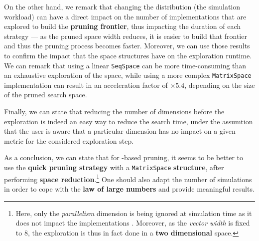 On the other hand, we remark that changing the distribution (\ie the simulation workload) can have a direct impact on the number of implementations that are explored to build the {\bf pruning frontier}, thus impacting the duration of each strategy --- as the pruned space width reduces, it is easier to build that frontier and thus the pruning process becomes faster.
Moreover, we can use those results to confirm the impact that the space structures have on the exploration runtime.
We can remark that using a linear \lstinline{SeqSpace} can be more time-consuming than an exhaustive exploration of the space, while using a more complex \lstinline{MatrixSpace} implementation can result in an acceleration factor of $\times 5.4$, depending on the size of the pruned search space.

Finally, we can state that reducing the number of dimensions before the exploration is indeed an easy way to reduce the search time, under the assumtion that the user is aware that a particular dimension has no impact on a given metric for the considered exploration step.

As a conclusion, we can state that for -based pruning, it seems to be better to use the {\bf quick pruning strategy} with a \lstinline{MatrixSpace} {\bf structure}, after performing {\bf space reduction}.\footnote{Here, only the {\it parallelism} dimension is being ignored at simulation time as it does not impact the implementations . Moreover, as the {\it vector width} is fixed to 8, the exploration is thus in fact done in a {\bf two dimensional} space.}
One should also adapt the number of simulations in order to cope with the {\bf law of large numbers} and provide meaningful  results.

\clearpage

